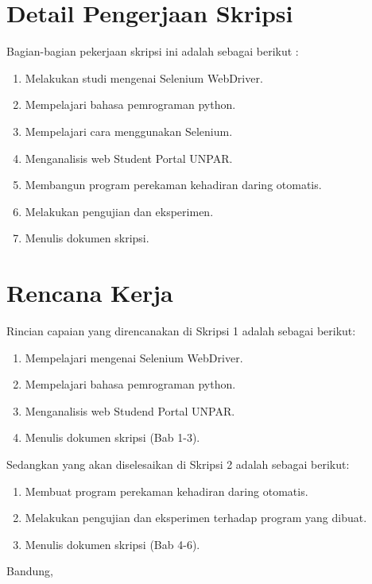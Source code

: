 \documentclass[a4paper,twoside]{article}
\begin{document}
\section{Detail Pengerjaan Skripsi}
Bagian-bagian pekerjaan skripsi ini adalah sebagai berikut :
	\begin{enumerate}
		\item Melakukan studi mengenai Selenium WebDriver.
		\item Mempelajari bahasa pemrograman python.
		\item Mempelajari cara menggunakan Selenium.
		\item Menganalisis web Student Portal UNPAR.
		\item Membangun program perekaman kehadiran daring otomatis.
		\item Melakukan pengujian dan eksperimen.
		\item Menulis dokumen skripsi.		
	\end{enumerate}

\section{Rencana Kerja}
Rincian capaian yang direncanakan di Skripsi 1 adalah sebagai berikut:
\begin{enumerate}
\item Mempelajari mengenai Selenium WebDriver.
\item Mempelajari bahasa pemrograman python.
\item Menganalisis web Studend Portal UNPAR. 
\item Menulis dokumen skripsi (Bab 1-3).
\end{enumerate}

Sedangkan yang akan diselesaikan di Skripsi 2 adalah sebagai berikut:
\begin{enumerate}
\item Membuat program perekaman kehadiran daring otomatis.
\item Melakukan pengujian dan eksperimen terhadap program yang dibuat.
\item Menulis dokumen skripsi (Bab 4-6).
\end{enumerate}

\vspace{1cm} %
\centering Bandung, \tanggal\\
\vspace{2cm} \nama \\ 
\vspace{1cm}
\end{document}
